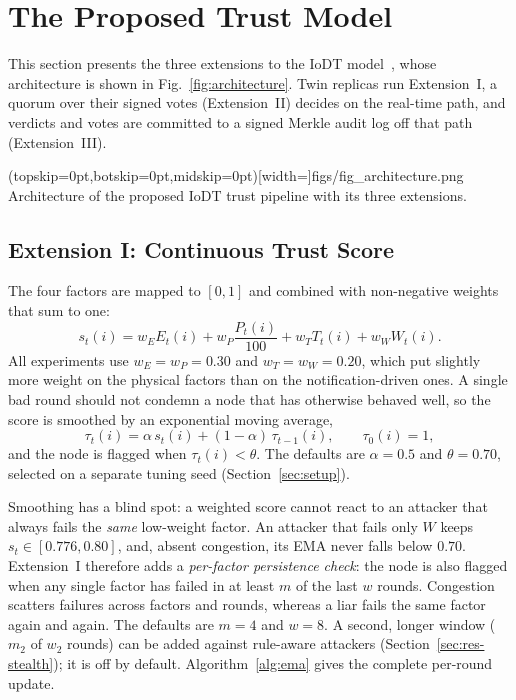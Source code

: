 \section{The Proposed Trust Model}
\label{sec:proposedModel}
This section presents the three extensions to the IoDT
model~\cite{soula2024iodt}, whose architecture is shown in
Fig.~\ref{fig:architecture}.  Twin replicas run Extension~I, a quorum
over their signed votes (Extension~II) decides on the real-time path,
and verdicts and votes are committed to a signed Merkle audit log off
that path (Extension~III).

\Figure[!t](topskip=0pt,botskip=0pt,midskip=0pt)[width=\textwidth]{figs/fig_architecture.png}
{Architecture of the proposed IoDT trust pipeline with its three extensions.\label{fig:architecture}}

\subsection{Extension I: Continuous Trust Score}
\label{subsec:ext1-math}
The four factors are mapped to $[0,1]$ and combined with non-negative
weights that sum to one:
\begin{equation}
s_{t}(i) = w_{E}E_{t}(i) + w_{P}\frac{P_{t}(i)}{100}
         + w_{T}T_{t}(i) + w_{W}W_{t}(i).
\label{eq:weighted_score}
\end{equation}
All experiments use $w_{E}=w_{P}=0.30$ and $w_{T}=w_{W}=0.20$, which
put slightly more weight on the physical factors than on the
notification-driven ones.  A single bad round should not condemn a
node that has otherwise behaved well, so the score is smoothed by an
exponential moving average,
\begin{equation}
\tau_{t}(i) = \alpha\,s_{t}(i) + (1-\alpha)\,\tau_{t-1}(i),
\qquad \tau_{0}(i)=1,
\label{eq:ema}
\end{equation}
and the node is flagged when $\tau_t(i)<\theta$.  The defaults are
$\alpha=0.5$ and $\theta=0.70$, selected on a separate tuning seed
(Section~\ref{sec:setup}).

Smoothing has a blind spot: a weighted score cannot react to an
attacker that always fails the \emph{same} low-weight factor.  An
attacker that fails only $W$ keeps $s_t\in[0.776,0.80]$, and, absent
congestion, its EMA never falls below $0.70$.  Extension~I therefore adds a
\emph{per-factor persistence check}: the node is also flagged when any
single factor has failed in at least $m$ of the last $w$ rounds.
Congestion scatters failures across factors and rounds, whereas a
liar fails the same factor again and again.  The defaults are $m=4$
and $w=8$.  A second, longer window ($m_2$ of $w_2$ rounds) can be
added against rule-aware attackers (Section~\ref{sec:res-stealth}); it
is off by default.  Algorithm~\ref{alg:ema} gives the complete
per-round update.

